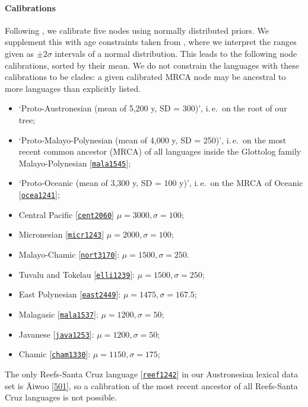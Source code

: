 \documentclass[]{rsos}%
\newcommand{\glot}[2]{#1 {\scriptsize{[\texttt{\href{https://glottolog.org/resource/languoid/id/#2}{#2}}]}}}
\begin{document}
\paragraph{Calibrations}
\newcommand{\abvd}[2]{#1 [\href{https://abvd.shh.mpg.de/austronesian/language.php?id=#2}{#2}]}
Following \textcite{greenhill2017evolutionary}, we calibrate five nodes using normally
distributed priors. We supplement this with age constraints taken from \textcite[Table S3]{gray2009language}, where we interpret the ranges given as $\pm 2\sigma$ intervals of a normal distribution. This leads to the following node calibrations, sorted by their mean. We do not constrain the languages with these calibrations to be clades: a given calibrated MRCA node may be ancestral to more languages than explicitly listed.
\begin{itemize}
\item ‘Proto-Austronesian (mean of 5,200 y, SD = 300)’, i.\,e.\ on the root of our tree;
\item ‘Proto-Malayo-Polynesian (mean of 4,000 y, SD = 250)’, i.\,e.\ on the most recent common ancestor (MRCA) of all languages inside the Glottolog family \glot{Malayo-Polynesian}{mala1545};
\item ‘Proto-Oceanic (mean of 3,300 y, SD = 100 y)’, i.\,e.\ on the MRCA of \glot{Oceanic}{ocea1241};
\item \glot{Central Pacific}{cent2060} $\mu=3000, \sigma=100$;
\item \glot{Micronesian}{micr1243} $\mu=2000, \sigma=100$;
\item \glot{Malayo-Chamic}{nort3170}: $\mu=1500, \sigma=250$.
\item \glot{Tuvalu and Tokelau}{elli1239}: $\mu=1500, \sigma=250$;
\item \glot{East Polynesian}{east2449}: $\mu=1475, \sigma=167.5$; 
\item \glot{Malagasic}{mala1537}: $\mu=1200, \sigma=50$;
\item \glot{Javanese}{java1253}: $\mu=1200, \sigma=50$;
\item \glot{Chamic}{cham1330}: $\mu=1150, \sigma=175$;
\end{itemize}
The only \glot{Reefs-Santa Cruz language}{reef1242} in our Austronesian lexical data set is \abvd{Äiwoo}{501}, so a calibration of the most recent ancestor of all Reefs-Santa Cruz languages is not possible.
\end{document}
